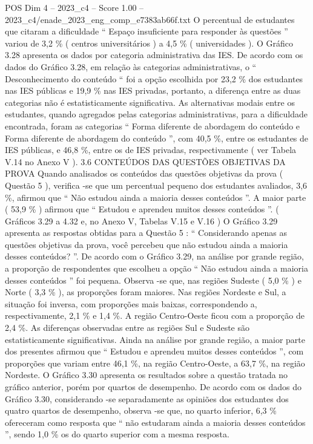 \begin{textsample}{POS Dim 4 – 2023\_c4 – Score 1.00 – 2023\_c4/enade\_2023\_eng\_comp\_e7383ab66f.txt}
O percentual de estudantes que citaram a dificuldade “ Espaço insuficiente para responder às questões ” variou de 3,2 \% ( centros universitários ) a 4,5 \% ( universidades ).
O Gráfico 3.28 apresenta os dados por categoria administrativa das IES.
De acordo com os dados do Gráfico 3.28, em relação às categorias administrativas, o “ Desconhecimento do conteúdo “ foi a opção escolhida por 23,2 \% dos estudantes nas IES públicas e 19,9 \% nas IES privadas, portanto, a diferença entre as duas categorias não é estatisticamente significativa.
As alternativas modais entre os estudantes, quando agregados pelas categorias administrativas, para a dificuldade encontrada, foram as categorias “ Forma diferente de abordagem do conteúdo e Forma diferente de abordagem do conteúdo ”, com 40,5 \%, entre os estudantes de IES públicas, e 46,8 \%, entre os de IES privadas, respectivamente ( ver Tabela V.14 no Anexo V ). 3.6 CONTEÚDOS DAS QUESTÕES OBJETIVAS DA PROVA Quando analisados os conteúdos das questões objetivas da prova ( Questão 5 ), verifica -se que um percentual pequeno dos estudantes avaliados, 3,6 \%, afirmou que “ Não estudou ainda a maioria desses conteúdos ”.
A maior parte ( 53,9 \% ) afirmou que “ Estudou e aprendeu muitos desses conteúdos ”. ( Gráficos 3.29 a 4.32 e, no Anexo V, Tabelas V.15 e V.16 ) O Gráfico 3.29 apresenta as respostas obtidas para a Questão 5 : “ Considerando apenas as questões objetivas da prova, você percebeu que não estudou ainda a maioria desses conteúdos? ”.
De acordo com o Gráfico 3.29, na análise por grande região, a proporção de respondentes que escolheu a opção “ Não estudou ainda a maioria desses conteúdos ” foi pequena.
Observa -se que, nas regiões Sudeste ( 5,0 \% ) e Norte ( 3,3 \% ), as proporções foram maiores.
Nas regiões Nordeste e Sul, a situação foi inversa, com proporções mais baixas, correspondendo a, respectivamente, 2,1 \% e 1,4 \%.
A região Centro-Oeste ficou com a proporção de 2,4 \%.
As diferenças observadas entre as regiões Sul e Sudeste são estatisticamente significativas.
Ainda na análise por grande região, a maior parte dos presentes afirmou que “ Estudou e aprendeu muitos desses conteúdos ”, com proporções que variam entre 46,1 \%, na região Centro-Oeste, a 63,7 \%, na região Nordeste.
O Gráfico 3.30 apresenta os resultados sobre a questão tratada no gráfico anterior, porém por quartos de desempenho.
De acordo com os dados do Gráfico 3.30, considerando -se separadamente as opiniões dos estudantes dos quatro quartos de desempenho, observa -se que, no quarto inferior, 6,3 \% ofereceram como resposta que “ não estudaram ainda a maioria desses conteúdos ”, sendo 1,0 \% os do quarto superior com a mesma resposta.

\end{textsample}

